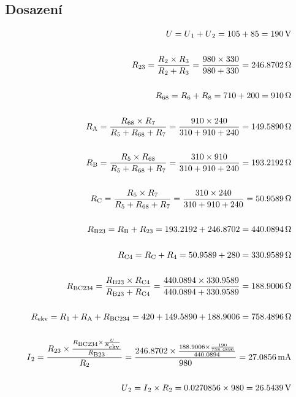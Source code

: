 \subsection{Dosazení}
\begin{align*}
    U = U\textsubscript{1} + U\textsubscript{2} = 105 + 85 = \SI{190}{\volt} \\ \\
    R\textsubscript{23} = \frac{R\textsubscript{2} \times R\textsubscript{3}}{R\textsubscript{2} + R\textsubscript{3}} = \frac{980 \times 330}{980 + 330} = \SI{246.8702}{\ohm} \\ \\
    R\textsubscript{68} = R\textsubscript{6}+R\textsubscript{8} = 710 + 200 = \SI{910}{\ohm} \\ \\
    R\textsubscript{A} = \frac{R\textsubscript{68} \times R\textsubscript{7}}{R\textsubscript{5} + R\textsubscript{68} + R\textsubscript{7}} = \frac{910 \times 240}{310 + 910 + 240} = \SI{149.5890}{\ohm}\\ \\
    R\textsubscript{B} = \frac{R\textsubscript{5} \times R\textsubscript{68}}{R\textsubscript{5} + R\textsubscript{68} + R\textsubscript{7}} = \frac{310 \times 910}{310 + 910 + 240} = \SI{193.2192}{\ohm}\\ \\
    R\textsubscript{C} = \frac{R\textsubscript{5} \times R\textsubscript{7}}{R\textsubscript{5} + R\textsubscript{68} + R\textsubscript{7}} = \frac{310 \times 240}{310 + 910 + 240} = \SI{50.9589}{\ohm}\\ \\
    R\textsubscript{B23} = R\textsubscript{B}+R\textsubscript{23} = 193.2192 + 246.8702 = \SI{440.0894}{\ohm} \\ \\
    R\textsubscript{C4} = R\textsubscript{C}+R\textsubscript{4} = 50.9589 + 280 = \SI{330.9589}{\ohm} \\ \\
    R\textsubscript{BC234} = \frac{R\textsubscript{B23} \times R\textsubscript{C4}}{R\textsubscript{B23} + R\textsubscript{C4}} = \frac{440.0894 \times 330.9589}{440.0894 + 330.9589} = \SI{188.9006}{\ohm}\\ \\
    R\textsubscript{ekv} = R\textsubscript{1} + R\textsubscript{A} + R\textsubscript{BC234} = 420 + 149.5890 + 188.9006 = \SI{758.4896}{\ohm} \\ \\
    I\textsubscript{2} = \frac{R\textsubscript{23} \times \frac{R\textsubscript{BC234} \times \frac{U}{R\textsubscript{ekv}}}{R\textsubscript{B23}}}{R\textsubscript{2}} = \frac{246.8702 \times \frac{188.9006 \times \frac{190}{758.4896}}{440.0894}}{980} = \SI{27.0856}{\milli\ampere}\\ \\
    U\textsubscript{2} = I\textsubscript{2} \times R\textsubscript{2} = 0.0270856 \times 980 = \SI{26.5439}{\volt}
\end{align*}